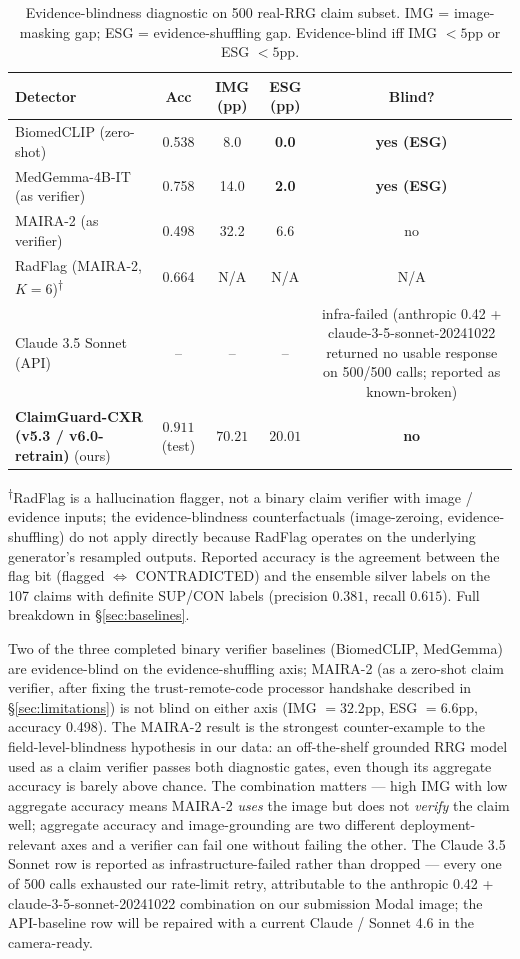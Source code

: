 \documentclass[pmlr]{jmlr}
\begin{document}
\begin{table}[t]
\centering
\small
\caption{Evidence-blindness diagnostic on 500 real-RRG claim subset. IMG = image-masking gap; ESG = evidence-shuffling gap. Evidence-blind iff IMG $< 5$pp or ESG $< 5$pp.}
\label{tab:baselines}
\begin{tabular}{lcccc}
\toprule
\textbf{Detector} & \textbf{Acc} & \textbf{IMG (pp)} & \textbf{ESG (pp)} & \textbf{Blind?} \\
\midrule
BiomedCLIP (zero-shot)         & 0.538 & 8.0   & \textbf{0.0}  & \textbf{yes (ESG)} \\
MedGemma-4B-IT (as verifier)   & 0.758 & 14.0  & \textbf{2.0}  & \textbf{yes (ESG)} \\
MAIRA-2 (as verifier)          & 0.498 & 32.2  & 6.6  & no \\
RadFlag (MAIRA-2, $K{=}6$)\textsuperscript{$\dagger$} & 0.664 & N/A & N/A & N/A \\
Claude 3.5 Sonnet (API)        & --    & --    & --    & infra-failed (anthropic 0.42 + claude-3-5-sonnet-20241022 returned no usable response on 500/500 calls; reported as known-broken) \\
\textbf{ClaimGuard-CXR (v5.3 / v6.0-retrain)} (ours) & $0.911$ (test) & $70.21$ & $20.01$ & \textbf{no} \\
\bottomrule
\end{tabular}

\noindent\textsuperscript{$\dagger$}\footnotesize{RadFlag is a hallucination flagger, not a binary claim verifier with image / evidence inputs; the evidence-blindness counterfactuals (image-zeroing, evidence-shuffling) do not apply directly because RadFlag operates on the underlying generator's resampled outputs. Reported accuracy is the agreement between the flag bit (flagged $\Leftrightarrow$ \textsc{CONTRADICTED}) and the ensemble silver labels on the 107 claims with definite \textsc{SUP}/\textsc{CON} labels (precision $0.381$, recall $0.615$). Full breakdown in §\ref{sec:baselines}.}
\end{table}

Two of the three completed binary verifier baselines (BiomedCLIP, MedGemma) are evidence-blind on the evidence-shuffling axis; MAIRA-2 (as a zero-shot claim verifier, after fixing the trust-remote-code processor handshake described in §\ref{sec:limitations}) is not blind on either axis (IMG $=32.2$pp, ESG $=6.6$pp, accuracy 0.498). The MAIRA-2 result is the strongest counter-example to the field-level-blindness hypothesis in our data: an off-the-shelf grounded RRG model used as a claim verifier passes both diagnostic gates, even though its aggregate accuracy is barely above chance. The combination matters — high IMG with low aggregate accuracy means MAIRA-2 \emph{uses} the image but does not \emph{verify} the claim well; aggregate accuracy and image-grounding are two different deployment-relevant axes and a verifier can fail one without failing the other. The Claude 3.5 Sonnet row is reported as infrastructure-failed rather than dropped — every one of 500 calls exhausted our rate-limit retry, attributable to the anthropic 0.42 + claude-3-5-sonnet-20241022 combination on our submission Modal image; the API-baseline row will be repaired with a current Claude / Sonnet 4.6 in the camera-ready.
\end{document}
